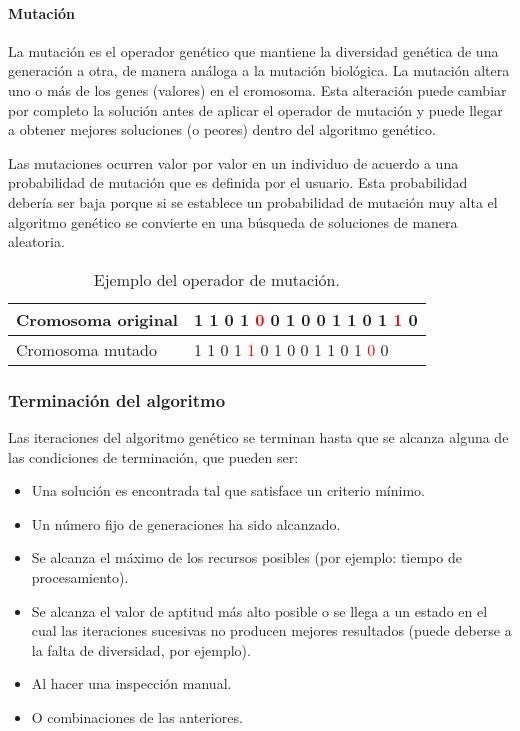 \paragraph{Mutaci\'on}

La mutación es el operador genético que mantiene la diversidad genética de una generación a otra, de manera análoga a la mutación biológica. La mutación altera uno o más de los genes (valores) en el cromosoma. Esta alteración puede cambiar por completo la solución antes de aplicar el operador de mutación y puede llegar a obtener mejores soluciones (o peores) dentro del algoritmo genético.\par

Las mutaciones ocurren valor por valor en un individuo de acuerdo a una probabilidad de mutación que es definida por el usuario. Esta probabilidad debería ser baja porque si se establece un probabilidad de mutación muy alta el algoritmo genético se convierte en una búsqueda de soluciones de manera aleatoria.

\begin{table}[H]
  \centering
  \begin{tabular}{|l|l|}
  \hline
  Cromosoma original & 1 1 0 1 \textcolor{red}{0} 0 1 0 0 1 1 0 1 \textcolor{red}{1} 0  \\ \hline
  Cromosoma mutado   & 1 1 0 1 \textcolor{red}{1} 0 1 0 0 1 1 0 1 \textcolor{red}{0} 0  \\ \hline
  \end{tabular}
  \caption{Ejemplo del operador de mutación.}
\end{table}

\subsubsection{Terminaci\'on del algoritmo}

Las iteraciones del algoritmo genético se terminan hasta que se alcanza alguna de las condiciones de terminación, que pueden ser:

\begin{itemize}
  \item Una solución es encontrada tal que satisface un criterio mínimo.
  \item Un número fijo de generaciones ha sido alcanzado.
  \item Se alcanza el máximo de los recursos posibles (por ejemplo: tiempo de procesamiento).
  \item Se alcanza el valor de aptitud más alto posible o se llega a un estado en el cual las iteraciones sucesivas no producen mejores resultados (puede deberse a la falta de diversidad, por ejemplo).
  \item Al hacer una inspección manual.
  \item O combinaciones de las anteriores.
\end{itemize}



